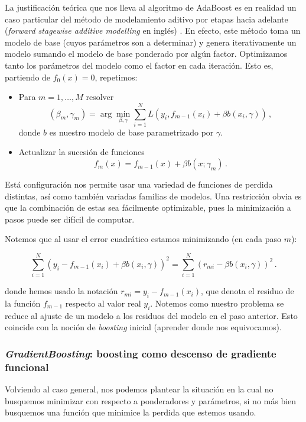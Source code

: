 La justificación teórica que nos lleva al algoritmo de AdaBoost es en realidad un caso particular del método de modelamiento aditivo por etapas hacia adelante (\textit{forward stagewise additive modelling} en inglés) \cite{ESLbook}. En efecto, este método toma un modelo de base (cuyos parámetros son a determinar) y genera iterativamente un modelo sumando el modelo de base ponderado por algún factor. Optimizamos tanto los parámetros del modelo como el factor en cada iteración. Esto es, partiendo de $f_0(x) = 0$, repetimos:

\begin{itemize}
    \item Para $m = 1 , \dots, M$ resolver
    $$ (\beta_m,\gamma_m) = \arg\min_{\beta,\gamma} \sum^N_{i=1} L(y_i, f_{m-1}(x_i)+ \beta b(x_i,\gamma) ) \,,$$
    donde $b$ es nuestro modelo de base parametrizado por $\gamma$.

    \item Actualizar la sucesión de funciones
    $$ f_m(x) = f_{m-1}(x) + \beta b(x;\gamma_m) \,.$$
\end{itemize}

Está configuración nos permite usar una variedad de funciones de perdida distintas, así como también variadas familias de modelos. Una restricción obvia es que la combinación de estas sea fácilmente optimizable, pues la minimización a pasos puede ser difícil de computar.

Notemos que al usar el error cuadrático estamos minimizando
(en cada paso $m$):

$$ \sum^N_{i=1}(y_i - f_{m-1}(x_i)+ \beta b(x_i,\gamma))^2 = \sum^N_{i=1} (r_{mi}-\beta b(x_i,\gamma))^2 \,.$$

donde hemos usado la notación $r_{mi} = y_i - f_{m-1}(x_i)$, que denota el residuo de la función $f_{m-1}$ respecto al valor real $y_i$. Notemos como nuestro problema se reduce al ajuste de un modelo a los residuos del modelo en el paso anterior. Esto coincide con la noción de \textit{boosting} inicial (aprender donde nos equivocamos).


\subsubsection{\textit{GradientBoosting}: boosting como descenso de gradiente funcional}

Volviendo al caso general, nos podemos plantear la situación en la cual no busquemos minimizar con respecto a ponderadores y parámetros, si no más bien busquemos una función que minimice la perdida que estemos usando.

